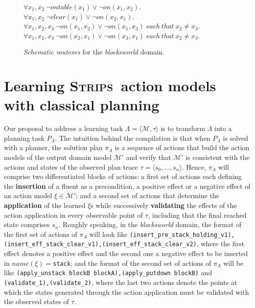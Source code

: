 \documentclass[runningheads]{llncs}
\newcommand{\tup}[1]{{\langle #1 \rangle}}
\newcommand{\strips}{\textsc{Strips}}     %
\begin{document}
\begin{figure}[hbt!]
  \begin{footnotesize}
$\forall x_1,x_2\ \neg ontable(x_1)\vee\neg on(x_1,x_2)$.\\
$\forall x_1,x_2\ \neg clear(x_1)\vee\neg on(x_2,x_1)$.\\
$\forall x_1,x_2,x_3\ \neg on(x_1,x_2)\vee\neg on(x_1,x_3)\ such\ that\ x_2\neq x_3$.\\
$\forall x_1,x_2,x_3\ \neg on(x_2,x_1)\vee\neg on(x_3,x_1)\ such\ that\ x_2\neq x_3$.\\
\end{footnotesize}
 \caption{\small {\em Schematic mutexes} for the {\em blocksworld} domain.}
\label{fig:strongest-invariant}
\end{figure}




\section{Learning \strips\ action models with classical planning}

Our proposal to address a learning task $\Lambda=\tup{\mathcal{M},\tau}$ is to transform $\Lambda$ into a planning task $P_{\Lambda}$. The intuition behind the compilation is that when $P_{\Lambda}$ is solved with a planner, the solution plan $\pi_\Lambda$ is a sequence of actions that build the action models of the output domain model $\mathcal{M'}$ and verify that $\mathcal{M'}$ is consistent with the actions and states of the observed plan trace $\tau = \tup {s_0, \ldots, s_n}$. Hence, $\pi_\Lambda$ will comprise two differentiated blocks of actions: a first set of actions each defining the \textbf{insertion} of a fluent as a precondition, a positive effect or a negative effect of an action model $\xi \in \mathcal{M'}$; and a second set of actions that determine the \textbf{application} of the learned $\xi$s while successively \textbf{validating} the effects of the action application in every observable point of $\tau$, including that the final reached state comprises $s_n$. Roughly speaking, in the \emph{blocksworld} domain, the format of the first set of actions of $\pi_\Lambda$ will look like {\tt{\small (insert\_pre\_stack\_holding\_v1),(insert\_eff\_stack\_clear\_v1),(insert\_eff\_stack\_clear\_v2)}}, where the first effect denotes a positive effect and the second one a negative effect to be inserted in $name(\xi)=${\tt{\small stack}}; and the format of the second set of actions of $\pi_\Lambda$ will be like {\tt{\small (apply\_unstack blockB blockA),(apply\_putdown blockB)}} and {\tt{\small (validate\_1),(validate\_2)}}, where the last two actions denote the points at which the states generated through the action application must be validated with the observed states of $\tau$.
\end{document}
